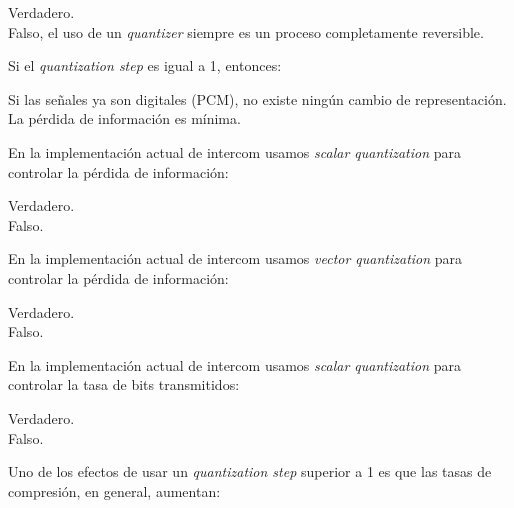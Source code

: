 \documentclass[legalpaper, 12pt, addpoints]{exam}
\begin{document}
\begin{questions}
\begin{oneparchoices}
  \choice Verdadero.\\
  \choice Falso, el uso de un \emph{quantizer} siempre es un proceso completamente reversible.
\end{oneparchoices}
  
\vspace{0.10in}

\question Si el \emph{quantization step} es igual a 1, entonces:

\begin{oneparchoices}
  \choice Si las señales ya son digitales (PCM), no existe ningún cambio de representación.\\
  \choice La pérdida de información es mínima.
\end{oneparchoices}
  
\vspace{0.10in}

\question En la implementación actual de intercom usamos \emph{scalar quantization} para controlar la pérdida de información:

\begin{oneparchoices}
  \choice Verdadero.\\
  \choice Falso.
\end{oneparchoices}
  
\vspace{0.10in}

\question En la implementación actual de intercom usamos \emph{vector quantization} para controlar la pérdida de información:

\begin{oneparchoices}
  \choice Verdadero.\\
  \choice Falso.
\end{oneparchoices}
  
\vspace{0.10in}

\question En la implementación actual de intercom usamos \emph{scalar quantization} para controlar la tasa de bits transmitidos:

\begin{oneparchoices}
  \choice Verdadero.\\
  \choice Falso.
\end{oneparchoices}
  
\vspace{0.10in}

\question Uno de los efectos de usar un \emph{quantization step} superior a 1 es que las tasas de compresión, en general, aumentan:


\end{questions}
\end{document}

